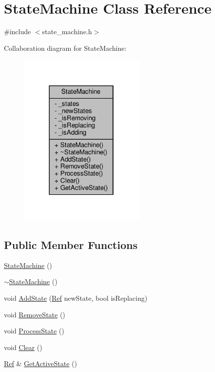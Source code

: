 \hypertarget{classStateMachine}{}\section{State\+Machine Class Reference}
\label{classStateMachine}


{\ttfamily \#include $<$state\+\_\+machine.\+h$>$}



Collaboration diagram for State\+Machine\+:
\nopagebreak
\begin{figure}[H]
\begin{center}
\leavevmode
\includegraphics[width=178pt]{classStateMachine__coll__graph}
\end{center}
\end{figure}
\subsection*{Public Member Functions}
\begin{DoxyCompactItemize}
\item 
\hyperlink{classStateMachine_a2fb07002510ea9141019559750acfab8}{State\+Machine} ()
\item 
\hyperlink{classStateMachine_a93d66cb2a89b186789d655a08b02674e}{$\sim$\+State\+Machine} ()
\item 
void \hyperlink{classStateMachine_a7814392717303d669b6d19f074f180da}{Add\+State} (\hyperlink{state__machine_8h_a6052c67656ab2e47e32df9051a84e8f4}{Ref} new\+State, bool is\+Replacing)
\item 
void \hyperlink{classStateMachine_aebefd3cef7db9e011e15f423061d1afc}{Remove\+State} ()
\item 
void \hyperlink{classStateMachine_a30f9ae4022e5177aeef777f4d7ea834f}{Process\+State} ()
\item 
void \hyperlink{classStateMachine_a7821c514a1e468c7fa891f2b5f5d102c}{Clear} ()
\item 
\hyperlink{state__machine_8h_a6052c67656ab2e47e32df9051a84e8f4}{Ref} \& \hyperlink{classStateMachine_a78bf24ece9baf3877ee9e3eec47ac4cc}{Get\+Active\+State} ()
\end{DoxyCompactItemize}
